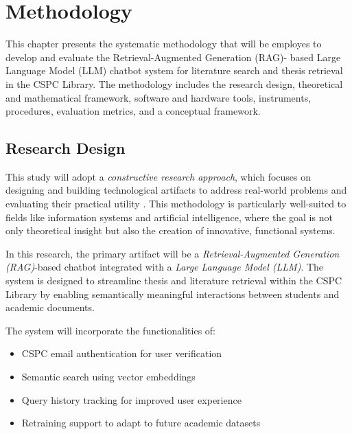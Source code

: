 
\chapter{Methodology}
\begin{refsection}
 
This chapter presents the systematic methodology that will be employes to develop and evaluate the Retrieval-Augmented Generation (RAG)- based Large Language Model (LLM) chatbot system for literature search and thesis retrieval in the CSPC Library. The methodology includes the research design, theoretical and mathematical framework, software and hardware tools, instruments, procedures, evaluation metrics, and a conceptual framework.

\section{Research Design}

This study will adopt a \textit{constructive research approach}, which focuses on designing and building technological artifacts to address real-world problems and evaluating their practical utility \citeauthor{lukka2003cons} \citeyear{lukka2003cons}. This methodology is particularly well-suited to fields like information systems and artificial intelligence, where the goal is not only theoretical insight but also the creation of innovative, functional systems.

In this research, the primary artifact will be a \textit{Retrieval-Augmented Generation (RAG)}-based chatbot integrated with a \textit{Large Language Model (LLM)}. The system is designed to streamline thesis and literature retrieval within the CSPC Library by enabling semantically meaningful interactions between students and academic documents. 

The system will incorporate the functionalities of:

\begin{samepage}
\begin{itemize}
    \item CSPC email authentication for user verification
    \item Semantic search using vector embeddings
    \item Query history tracking for improved user experience
    \item Retraining support to adapt to future academic datasets
\end{itemize}
\end{samepage}



\end{refsection}
